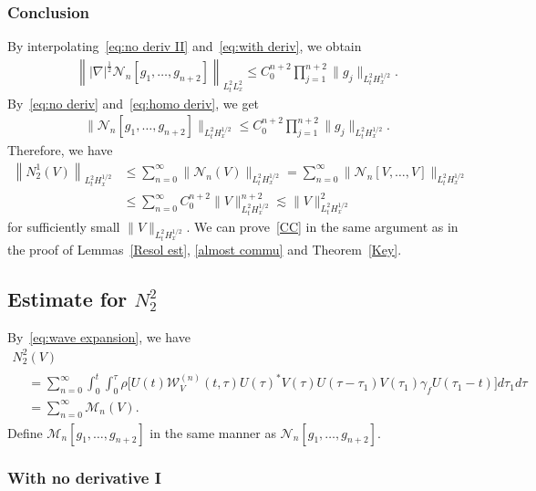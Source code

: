 \documentclass[AHL,Unicode,longabstracts,MathTools,published]{cedram}
\newcommand{\CM}{\mathcal{M}}
\newcommand{\CN}{\mathcal{N}}
\newcommand{\CW}{\mathcal{W}}
\newcommand{\ga}{\gamma}
\newcommand{\ta}{\tau}
\newcommand{\rh}{\rho}
\newcommand{\I}{\infty}
\newcommand{\tw}{\frac{1}{2}}
\newcommand{\na}{\nabla}
\newcommand{\ls}{\lesssim}
\begin{document}
\subsubsection{Conclusion} 

By interpolating~\eqref{eq:no deriv II} and~\eqref{eq:with deriv}, we obtain
\begin{align}\label{eq:homo deriv}
\left\||\na|^\tw \CN_n[g_1,\dots,g_{n+2}]\right\|_{L^2_t L^2_x} \le C_0^{n+2} \prod_{j=1}^{n+2} \|g_j\|_{L^2_t H^{1/2}_x}.
\end{align}
By~\eqref{eq:no deriv} and~\eqref{eq:homo deriv}, we get
\begin{align}
\|\CN_n [g_1,\dots,g_{n+2}]\|_{L^2_t H^{1/2}_x} \le C_0^{n+2} \prod_{j=1}^{n+2} \|g_j\|_{L^2_t H^{1/2}_x}.
\end{align}
Therefore, we have
\begin{equation}
\begin{split}
\left\|N_2^1(V)\right\|_{L^2_t H^{1/2}_x} &\le \sum_{n=0}^\I \|\CN_n(V)\|_{L^2_t H^{1/2}_x} = \sum_{n=0}^\I \|\CN_n[V,\dots,V]\|_{L^2_t H^{1/2}_x} \\
&\le \sum_{n=0}^\I C_0^{n+2} \|V\|_{L^2_t H^{1/2}_x}^{n+2}
\ls \|V\|_{L^2_t H^{1/2}_x}^2
\end{split}
\end{equation}
for sufficiently small $\|V\|_{L^2_t H^{1/2}_x}$. We can prove~\eqref{CC} in the same argument as in the proof of Lemmas~\ref{Resol est}, \ref{almost commu} and Theorem~\ref{Key}.


\subsection{Estimate for \texorpdfstring{$N_2^2$}{N22}} 

By~\eqref{eq:wave expansion}, we have
\begin{multline}
N_2^2(V)\\
\begin{aligned}
 &= \sum_{n=0}^\I \int_0^t \int_0^\ta
\rh \Big[U(t) \CW_V^{(n)}(t,\ta)U(\ta)^* V(\ta)U(\ta-\ta_1) V(\ta_1) \ga_f U(\ta_1-t) \Big] d\ta_1 d\ta \\
&= \sum_{n=0}^\I \CM_n(V).
\end{aligned}
\end{multline}
Define $\CM_n[g_1, \dots, g_{n+2}]$ in the same manner as $\CN_n[g_1,\dots, g_{n+2}]$.

\subsubsection{With no derivative I} 
\end{document}
